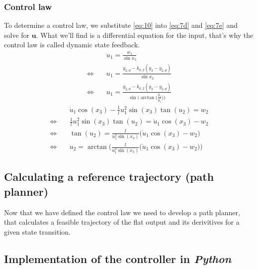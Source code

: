 \documentclass[a4paper,11pt,headings=standardclasses]{scrartcl}%
\newcommand{\py}{\emph{Python}\,}
\newcommand{\uu}{\mathbf{u}}
\begin{document}
\subsubsection{Control law}
To determine a control law, we substitute \eqref{eq:10} into \eqref{eq:7d} and \eqref{eq:7e} and solve for $\uu$. What we'll find is a differential equation for the input, that's why the control law is called dynamic state feedback.
\begin{subequations}
\begin{align}
&u_1 = \frac{w_1}{\sin{x_3}} \\
\Leftrightarrow \quad & u_1 = \frac{\dot{y}_{2,d} - k_{0,2}(y_2-y_{2,d})}{\sin{x_3}} \\
\Leftrightarrow \quad & u_1 = \frac{\dot{y}_{2,d} - k_{0,2}(y_2-y_{2,d})}{\sin\Big({\arctan\Big(\frac{\dot{y}_2}{\dot{y}_1}\Big)\Big)}}
\end{align}
\end{subequations}
\begin{subequations}
\begin{align}
&\dot{u}_1 \cos(x_3) - \frac{1}{l}u_1^2\sin(x_3)\tan(u_2) = w_2 \\
\Leftrightarrow \quad & \frac{1}{l}u_1^2\sin(x_3)\tan(u_2) = \dot{u}_1 \cos(x_3) - w_2  \\
\Leftrightarrow \quad & \tan(u_2) = \frac{l}{u_1^2\sin(x_3)}\Big(\dot{u}_1 \cos(x_3) - w_2 \Big)  \\
\Leftrightarrow \quad & u_2 = \arctan\Big(\frac{l}{u_1^2\sin(x_3)}\Big(\dot{u}_1 \cos(x_3) - w_2 \Big)\Big)
\end{align}
\end{subequations}
\subsection{Calculating a reference trajectory (path planner)}
Now that we have defined the control law we need to develop a path planner, that calculates a feasible trajectory of the flat output and its derivitives for a given state transition.

\centering{\textcolor{red}{figure: showing a state transition}}

\subsection{Implementation of the controller in \py}
\centering{\textcolor{red}{work in progress}}

\end{document}
